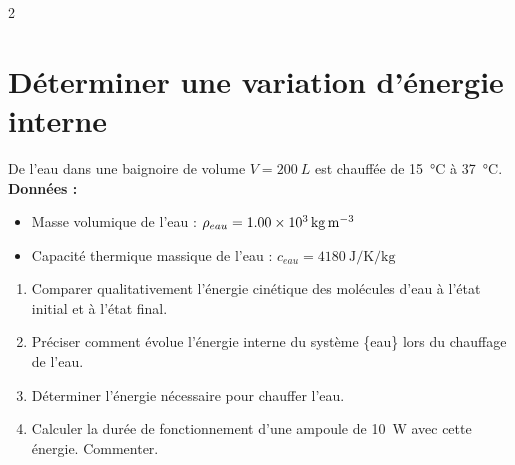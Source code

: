 \documentclass[a4paper,11pt,fleqn]{article}%
\begin{document}
	\maketitle
\begin{multicols}{2}
\section{Déterminer une variation d'énergie interne}
De l'eau dans une baignoire de volume $V = \SI{200}{L}$ est chauffée de \SI{15}{\celsius} à \SI{37}{\celsius}.\\
\textbf{Données :}
\begin{itemize}
	\item Masse volumique de l'eau : $\rho_{eau} = \SI{1,00E3}{\kilo\gram\per\meter\cubed}$
	\item Capacité thermique massique de l'eau : $c_{eau} = \SI{4180}{\joule\per\kelvin\per\kilo\gram}$
\end{itemize}
\begin{enumerate}
	\item Comparer qualitativement l'énergie cinétique des molécules d'eau à l'état initial et à l'état final.
	\item Préciser comment évolue l'énergie interne du système \{eau\} lors du chauffage de l'eau.
	\item Déterminer l'énergie nécessaire pour chauffer l'eau.
	\item Calculer la durée de fonctionnement d'une ampoule de \SI{10}{W} avec cette énergie. Commenter.
\end{enumerate}


\end{multicols}
\end{document}
